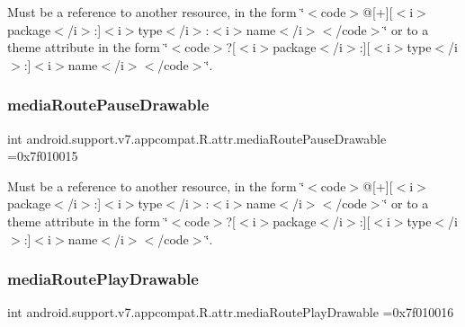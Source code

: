Must be a reference to another resource, in the form \char`\"{}$<$code$>$@\mbox{[}+\mbox{]}\mbox{[}$<$i$>$package$<$/i$>$\+:\mbox{]}$<$i$>$type$<$/i$>$\+:$<$i$>$name$<$/i$>$$<$/code$>$\char`\"{} or to a theme attribute in the form \char`\"{}$<$code$>$?\mbox{[}$<$i$>$package$<$/i$>$\+:\mbox{]}\mbox{[}$<$i$>$type$<$/i$>$\+:\mbox{]}$<$i$>$name$<$/i$>$$<$/code$>$\char`\"{}. \mbox{\label{classandroid_1_1support_1_1v7_1_1appcompat_1_1R_1_1attr_a7204d16c44f7535d8d1fcce7aad07229}} 
\subsubsection{\texorpdfstring{media\+Route\+Pause\+Drawable}{mediaRoutePauseDrawable}}
{\footnotesize\ttfamily int android.\+support.\+v7.\+appcompat.\+R.\+attr.\+media\+Route\+Pause\+Drawable =0x7f010015\hspace{0.3cm}{\ttfamily [static]}}

Must be a reference to another resource, in the form \char`\"{}$<$code$>$@\mbox{[}+\mbox{]}\mbox{[}$<$i$>$package$<$/i$>$\+:\mbox{]}$<$i$>$type$<$/i$>$\+:$<$i$>$name$<$/i$>$$<$/code$>$\char`\"{} or to a theme attribute in the form \char`\"{}$<$code$>$?\mbox{[}$<$i$>$package$<$/i$>$\+:\mbox{]}\mbox{[}$<$i$>$type$<$/i$>$\+:\mbox{]}$<$i$>$name$<$/i$>$$<$/code$>$\char`\"{}. \mbox{\label{classandroid_1_1support_1_1v7_1_1appcompat_1_1R_1_1attr_acfa4ada8714bdd2f4ad0cc6100b82fd1}} 
\subsubsection{\texorpdfstring{media\+Route\+Play\+Drawable}{mediaRoutePlayDrawable}}
{\footnotesize\ttfamily int android.\+support.\+v7.\+appcompat.\+R.\+attr.\+media\+Route\+Play\+Drawable =0x7f010016\hspace{0.3cm}{\ttfamily [static]}}

